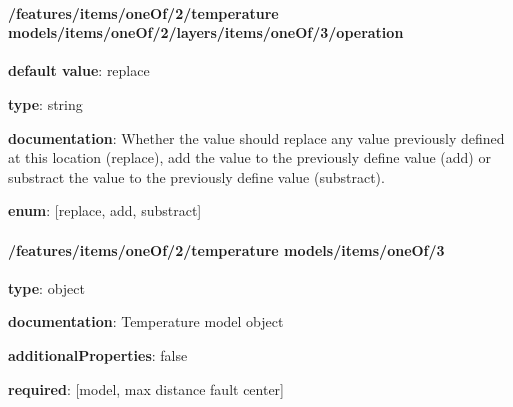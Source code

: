 \begin{itemized}
\end{itemized}\paragraph{/features/items/oneOf/2/temperature models/items/oneOf/2/layers/items/oneOf/3/operation} \begin{itemized}
\item {\bf default value}: replace
\item {\bf type}: string
\item {\bf documentation}: Whether the value should replace any value previously defined at this location (replace), add the value to the previously define value (add) or substract the value to the previously define value (substract).
\item {\bf enum}: [replace, add, substract]\end{itemized}\paragraph{/features/items/oneOf/2/temperature models/items/oneOf/3} \begin{itemized}
\item {\bf type}: object
\item {\bf documentation}: Temperature model object
\item {\bf additionalProperties}: false
\item {\bf required}: [model, max distance fault center]\end{itemized}
